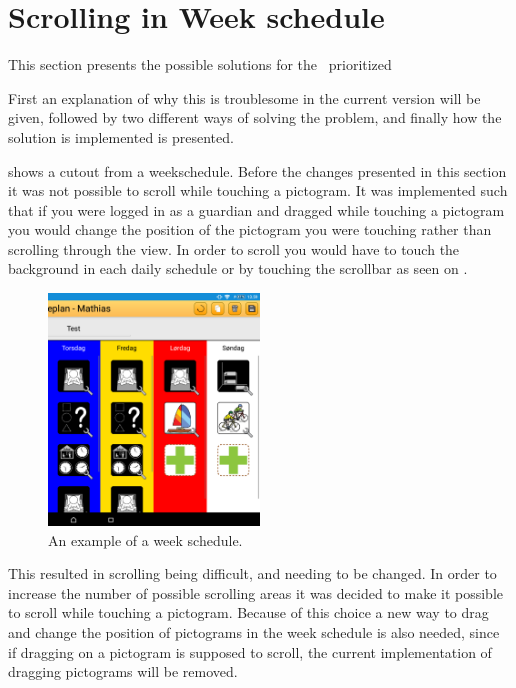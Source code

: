 \section{Scrolling in Week schedule}

This section presents the possible solutions for the \phigh~prioritized

First an explanation of why this is troublesome in the current version will be given, followed by two different ways of solving the problem, and finally how the solution is implemented is presented.


 shows a cutout from a weekschedule. 
Before the changes presented in this section it was not possible to scroll while touching a pictogram. 
It was implemented such that if you were logged in as a guardian and dragged while touching a pictogram you would change the position of the pictogram you were touching rather than scrolling through the view.
In order to scroll you would have to touch the background in each daily schedule or by touching the scrollbar as seen on .

\begin{figure}[ht]
\centering
\includegraphics[width=0.5\textwidth]{figures/img/screenshots/weekplan_schedule.png}
\caption{An example of a week schedule.}
\label{fig:weekschedule}
\end{figure}

This resulted in scrolling being difficult, and needing to be changed.
In order to increase the number of possible scrolling areas it was decided to make it possible to scroll while touching a pictogram.
Because of this choice a new way to drag and change the position of pictograms in the week schedule is also needed, since if dragging on a pictogram is supposed to scroll, the current implementation of dragging pictograms will be removed.


